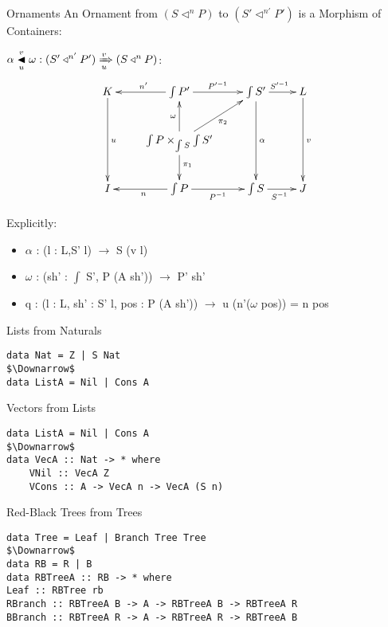 \documentclass{beamer}
\newcommand{\xycenter}[1]{\vcenter{\hbox{\xymatrix{#1}}}}
\begin{document}
\begin{frame}{Ornaments}
An \alert{Ornament} from $(S \triangleleft^{n} P)$ to $(S' \triangleleft^{n'} P')$ is a \alert{Morphism of Containers}:

$\alpha \underset{u}{\overset{v}{\blacktriangleleft}} \omega : (S' \triangleleft^{n'} P') \xRightarrow[u]{v} (S \triangleleft^n P)$:
 \[ \xycenter{
  K \ar[dd]^u & \int P'  \ar[r]^{P'^{-1}} \ar[l]_{n'} & \int S' \ar[dd]^{\alpha} \ar[r]^{S'^{-1}} & L 
  \ar[dd]^v   \\
    & \ar[ur]_{\pi_2} \int P \times_{\int S} \int S' \ar[d]^{\pi_1} \ar[u]^{\omega} &  & \\
  I  & \int P \ar[r]_{P^{-1}} \ar[l]^{n} & \int S \ar[r]_{S^{-1}}   &J} 
  \]
  
  Explicitly: 
\begin{itemize}
\item[] $\alpha$ : (l : L,S' l) $\to$ S (v l)
\item[] $\omega$ : (sh' : $\int$ S', P (A sh')) $\to$ P' sh'
\item[] q : (l : L, sh' : S' l, pos : P (A sh')) $\to$ u (n'($\omega$ pos)) = n pos
\end{itemize}
\end{frame}

\begin{frame}[fragile]{Lists from Naturals}
\begin{lstlisting}
data Nat = Z | S Nat
$\Downarrow$
data ListA = Nil | Cons A
\end{lstlisting}
\end{frame}

\begin{frame}[fragile]{Vectors from Lists}
\begin{lstlisting}
data ListA = Nil | Cons A
$\Downarrow$
data VecA :: Nat -> * where
    VNil :: VecA Z
    VCons :: A -> VecA n -> VecA (S n)
\end{lstlisting}
\end{frame}

\begin{frame}[fragile]{Red-Black Trees from Trees}

\begin{lstlisting}
data Tree = Leaf | Branch Tree Tree
$\Downarrow$
data RB = R | B
data RBTreeA :: RB -> * where
Leaf :: RBTree rb
RBranch :: RBTreeA B -> A -> RBTreeA B -> RBTreeA R
BBranch :: RBTreeA R -> A -> RBTreeA R -> RBTreeA B
\end{lstlisting}

\end{frame}
\end{document}
